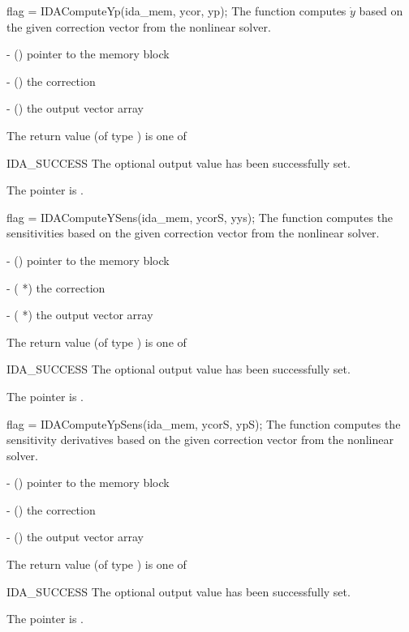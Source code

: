 {
  flag = IDAComputeYp(ida\_mem, ycor, yp);
}
{
  The function computes $\dot{y}$ based on the given correction
  vector from the nonlinear solver.
}
{
  \begin{args}
    \item {} - () pointer to the {\ida} memory block
    \item {} - () the correction
    \item {} - () the output vector array
  \end{args}
}
{
  The return value  (of type ) is one of
  \begin{args}
  \item[IDA\_SUCCESS]
    The optional output value has been successfully set.
  \item[\Id{IDA\_MEM\_NULL}]
    The  pointer is .
  \end{args}
}
{}

{
  flag = IDAComputeYSens(ida\_mem, ycorS, yys);
}
{
  The function computes the sensitivities based on the given correction
  vector from the nonlinear solver.
}
{
  \begin{args}
    \item {} - () pointer to the {\ida} memory block
    \item {} - ( *) the correction
    \item {} - ( *) the output vector array
  \end{args}
}
{
  The return value  (of type ) is one of
  \begin{args}
  \item[IDA\_SUCCESS]
    The optional output value has been successfully set.
  \item[\Id{IDA\_MEM\_NULL}]
    The  pointer is .
  \end{args}
}
{}

{
  flag = IDAComputeYpSens(ida\_mem, ycorS, ypS);
}
{
  The function computes the sensitivity derivatives based on the
  given correction vector from the nonlinear solver.
}
{
  \begin{args}
    \item {} - () pointer to the {\ida} memory block
    \item {} - () the correction
    \item {} - () the output vector array
  \end{args}
}
{
  The return value  (of type ) is one of
  \begin{args}
  \item[IDA\_SUCCESS]
    The optional output value has been successfully set.
  \item[\Id{IDA\_MEM\_NULL}]
    The  pointer is .
  \end{args}
}
{}



